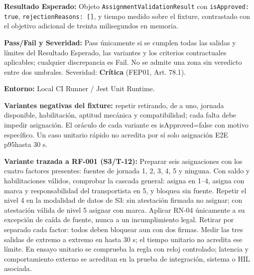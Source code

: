 \par\noindent\textbf{Resultado Esperado:} Objeto \texttt{A\allowbreak{}s\allowbreak{}s\allowbreak{}i\allowbreak{}g\allowbreak{}n\allowbreak{}m\allowbreak{}e\allowbreak{}n\allowbreak{}t\allowbreak{}V\allowbreak{}a\allowbreak{}l\allowbreak{}i\allowbreak{}d\allowbreak{}a\allowbreak{}t\allowbreak{}i\allowbreak{}o\allowbreak{}n\allowbreak{}R\allowbreak{}e\allowbreak{}s\allowbreak{}u\allowbreak{}l\allowbreak{}t\allowbreak{}} con \texttt{i\allowbreak{}s\allowbreak{}A\allowbreak{}p\allowbreak{}p\allowbreak{}r\allowbreak{}o\allowbreak{}v\allowbreak{}e\allowbreak{}d\allowbreak{}:\allowbreak{} t\allowbreak{}r\allowbreak{}u\allowbreak{}e\allowbreak{}}, \texttt{r\allowbreak{}e\allowbreak{}j\allowbreak{}e\allowbreak{}c\allowbreak{}t\allowbreak{}i\allowbreak{}o\allowbreak{}n\allowbreak{}R\allowbreak{}e\allowbreak{}a\allowbreak{}s\allowbreak{}o\allowbreak{}n\allowbreak{}s\allowbreak{}:\allowbreak{} [\allowbreak{}]\allowbreak{}}, y tiempo medido sobre el fixture, contrastado con el objetivo adicional de treinta milisegundos en memoria.\par
\par\noindent\textbf{Pass/Fail y Severidad:} Pass únicamente si se cumplen todas las salidas y límites del Resultado Esperado, las variantes y los criterios contractuales aplicables; cualquier discrepancia es Fail. No se admite una zona sin veredicto entre dos umbrales. Severidad: \textbf{Crítica} (FEP01, Art. 78.1).\par
\par\noindent\textbf{Entorno:} Local CI Runner / Jest Unit Runtime.\par






\par\noindent\textbf{Variantes negativas del fixture:} repetir retirando, de a uno, jornada disponible, habilitación, aptitud mecánica y compatibilidad; cada falta debe impedir asignación. El oráculo de cada variante es isApproved=false con motivo específico. Un caso unitario rápido no acredita por sí solo asignación E2E p95hasta 30 s.\par\par


\par\noindent\textbf{Variante trazada a RF-001 (S3/T-12):} Preparar seis asignaciones con los cuatro factores presentes: fuentes de jornada 1, 2, 3, 4, 5 y ninguna. Con saldo y habilitaciones válidos, comprobar la cascada general: asigna en 1–4, asigna con marca y responsabilidad del transportista en 5, y bloquea sin fuente. Repetir el nivel 4 en la modalidad de datos de S3: sin atestación firmada no asignar; con atestación válida de nivel 5 asignar con marca. Aplicar RN-04 únicamente a su excepción de caída de fuente, nunca a un incumplimiento legal. Retirar por separado cada factor: todos deben bloquear aun con dos firmas. Medir las tres salidas de extremo a extremo en hasta 30 s; el tiempo unitario no acredita ese límite. En ensayo unitario se comprueba la regla con reloj controlado; latencia y comportamiento externo se acreditan en la prueba de integración, sistema o HIL asociada.\par

